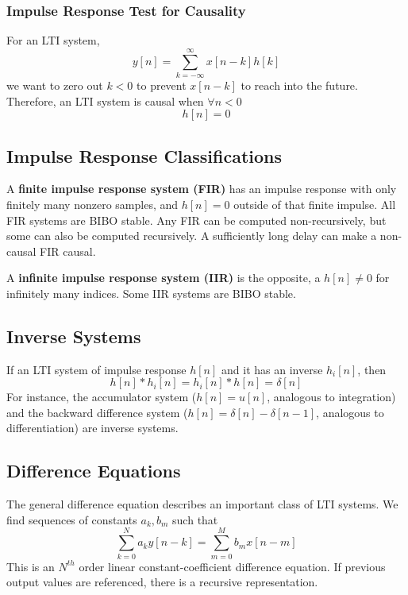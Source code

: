 \documentclass{article}
\begin{document}
\subsubsection{Impulse Response Test for Causality}
For an LTI system,
\[
    y[n] = \sum_{k=-\infty}^\infty x[n-k]h[k]
\]
we want to zero out $k<0$ to prevent $x[n-k]$ to reach into the future. Therefore, an LTI system is causal when $\forall n<0$
\begin{equation}
    h[n]=0
\end{equation}


\subsection{Impulse Response Classifications}
A \textbf{finite impulse response system (FIR)} has an impulse response with only finitely many nonzero samples, and $h[n]=0$ outside of that finite impulse. All FIR systems are BIBO stable.
Any FIR can be computed non-recursively, but some can also be computed recursively. A sufficiently long delay can make a non-causal FIR causal.

A \textbf{infinite impulse response system (IIR)} is the opposite, a $h[n]\ne0$ for infinitely many indices. Some IIR systems are BIBO stable.


\subsection{Inverse Systems}
If an LTI system of impulse response $h[n]$ and it has an inverse $h_i[n]$, then
\[ h[n]*h_i[n]  = h_i[n] * h[n] = \delta[n]\]
For instance, the accumulator system ($h[n] = u[n]$, analogous to integration) and the backward difference system ($h[n] = \delta[n]-\delta[n-1]$, analogous to differentiation) are inverse systems.

\subsection{Difference Equations}
The general difference equation describes an important class of LTI systems. We find sequences of constants $a_k,b_m$ such that
\[
    \sum_{k=0}^N a_ky[n-k] = \sum_{m=0}^M b_m x[n-m]
\]
This is an $N^{th}$ order linear constant-coefficient difference equation. If previous output values are referenced, there is a recursive representation.
\end{document}
